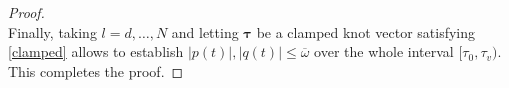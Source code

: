 \documentclass[journal,10pt]{IEEEtran}
\newcommand{\vect}[1]{\boldsymbol{\mathbf{#1}}}
\newif\ifdraft
\newcommand{\XX}[1]{\ifdraft{\color{red}[{\bf XX}: #1]}\fi}
\newcommand{\VF}[1]{\ifdraft{\color{blue}[{\bf VF}: #1]}\fi}
\begin{document}
\begin{proof}
\begin{equation*}
\end{equation*}
Finally, taking $l=d,\ldots,N$ and letting $\vect{\tau}$ be a clamped knot vector satisfying \eqref{clamped} allows to establish $|p(t)|,|q(t)|\leq \overline{\omega}$ over the whole interval $[\tau_0,\tau_v)$. This completes the proof.
\end{proof}
\end{document}
